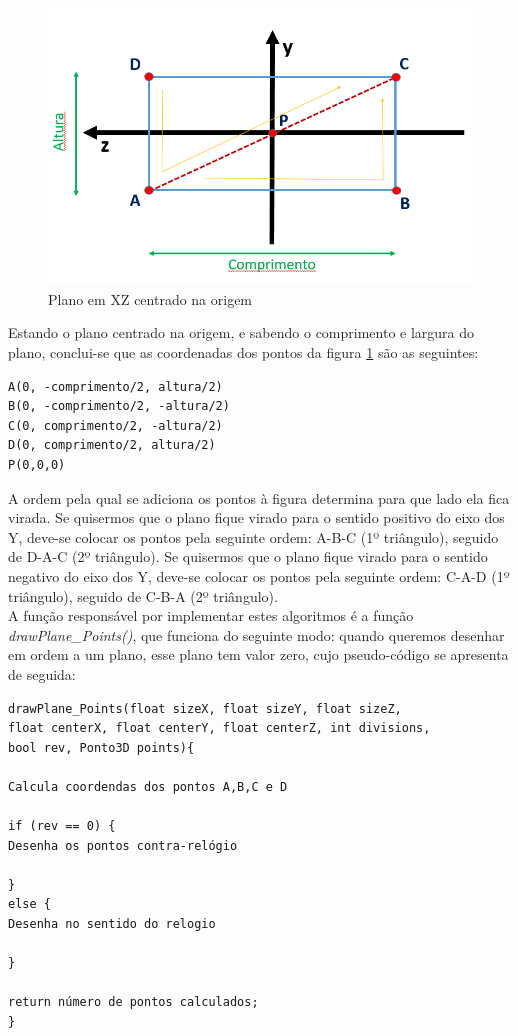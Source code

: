 \begin{figure}[<+htpb+>]
	\centering
	\includegraphics[scale=0.5]{imagens/p3_planoZ.png}
	\caption{Plano em XZ centrado na origem}
	\label{p1:fig:p3_planoZ}
\end{figure}

Estando o plano centrado na origem, e sabendo o comprimento e largura do plano, conclui-se que as coordenadas dos pontos da figura \ref{p1:fig:p3_planoZ} são as seguintes:

\begin{Verbatim}
A(0, -comprimento/2, altura/2)
B(0, -comprimento/2, -altura/2)
C(0, comprimento/2, -altura/2)
D(0, comprimento/2, altura/2)
P(0,0,0)
\end{Verbatim}


A ordem pela qual se adiciona os pontos à figura determina para que lado ela fica virada. Se quisermos que o plano fique virado para o sentido positivo do eixo dos Y, deve-se colocar os pontos pela seguinte ordem: A-B-C (1º triângulo), seguido de D-A-C (2º triângulo). Se quisermos que o plano fique virado para o sentido negativo do eixo dos Y, deve-se colocar os pontos pela seguinte ordem: C-A-D (1º triângulo), seguido de C-B-A (2º triângulo).
\\

A função responsável por implementar estes algoritmos é a função \textit{drawPlane\_Points()}, que funciona do seguinte modo: quando queremos desenhar em ordem a um plano, esse plano tem valor zero, cujo pseudo-código se apresenta de seguida:

\begin{Verbatim}
drawPlane_Points(float sizeX, float sizeY, float sizeZ, 
float centerX, float centerY, float centerZ, int divisions,
bool rev, Ponto3D points){

Calcula coordendas dos pontos A,B,C e D

if (rev == 0) {
Desenha os pontos contra-relógio

}
else {
Desenha no sentido do relogio

}

return número de pontos calculados;
}
\end{Verbatim}



